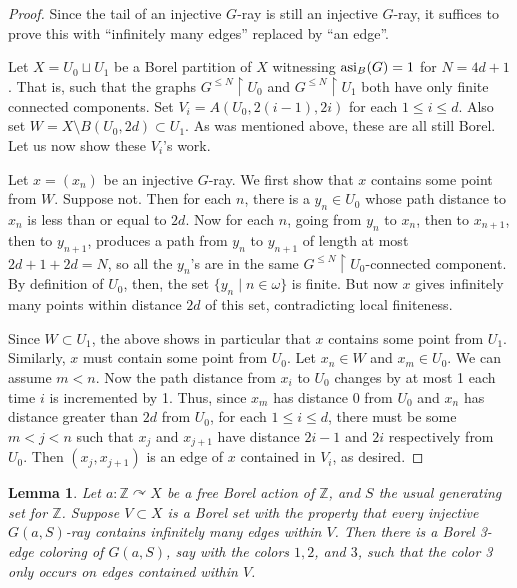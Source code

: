 \documentclass[12pt]{article}
\newcommand{\0}{\varnothing}
\newcommand{\Z}{\mathbb{Z}}
\newcommand{\asi}{\textnormal{asi}}
\newcommand{\res}{\upharpoonright}
\newtheorem{lemma}{Lemma}
\begin{document}
\begin{proof}
Since the tail of an injective $G$-ray is still an injective $G$-ray, it suffices to prove this with ``infinitely many edges'' replaced by ``an edge''. 

Let $X = U_0 \sqcup U_1$ be a Borel partition of $X$ witnessing $\asi_B(G) = 1$ for $N = 4d+1$. That is, such that the graphs $G^{\leq N} \res U_0$ and $G^{\leq N} \res U_1$ both have only finite connected components. Set $V_i = A(U_0,2(i-1),2i)$ for each $1 \leq i \leq d$. Also set $W = X \setminus B(U_0,2d) \subset U_1$. As was mentioned above, these are all still Borel. Let us now show these $V_i$'s work.

Let $x = (x_n)$ be an injective $G$-ray. We first show that $x$ contains some point from $W$. Suppose not. Then for each $n$, there is a $y_n \in U_0$ whose path distance to $x_n$ is less than or equal to $2d$. Now for each $n$, going from $y_n$ to $x_n$, then to $x_{n+1}$, then to $y_{n+1}$, produces a path from $y_n$ to $y_{n+1}$ of length at most $2d+1+2d=N$, so all the $y_n$'s are in the same $G^{\leq N} \res U_0$-connected component. By definition of $U_0$, then, the set $\{y_n \mid n \in \omega\}$ is finite. But now $x$ gives infinitely many points within distance $2d$ of this set, contradicting local finiteness.

Since $W \subset U_1$, the above shows in particular that $x$ contains some point from $U_1$. Similarly, $x$ must contain some point from $U_0$. Let $x_n \in W$ and $x_m \in U_0$. We can assume $m < n$. Now the path distance from $x_i$ to $U_0$ changes by at most 1 each time $i$ is incremented by 1. Thus, since $x_m$ has distance 0 from $U_0$ and $x_n$ has distance greater than $2d$ from $U_0$, for each $1 \leq i \leq d$, there must be some $m < j < n$ such that $x_{j}$ and $x_{j+1}$ have distance $2i-1$ and $2i$ respectively from $U_0$. Then $(x_j,x_{j+1})$ is an edge of $x$ contained in $V_i$, as desired.

\end{proof}

\begin{lemma}\label{lem:Z}
Let $a:\Z \curvearrowright X$ be a free Borel action of $\Z$, and $S$ the usual generating set for $\Z$. Suppose $V \subset X$ is a Borel set with the property that every injective $G(a,S)$-ray contains infinitely many edges within $V$. Then there is a Borel 3-edge coloring of $G(a,S)$, say with the colors $1,2$, and $3$, such that the color 3 only occurs on edges contained within $V$.
\end{lemma}
\end{document}
